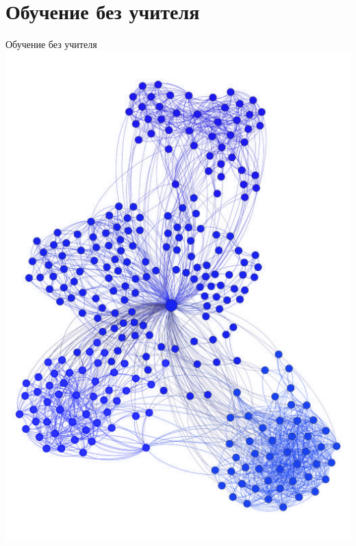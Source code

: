 \documentclass[10pt]{beamer}
\begin{document}
\section{Обучение без учителя}

{
\begin{frame}{Обучение без учителя}
  \centering
  \includegraphics[width=0.9 \linewidth, height=0.9 \textheight, keepaspectratio]{images/clustering1}\\
\end{frame}
}
\end{document}
